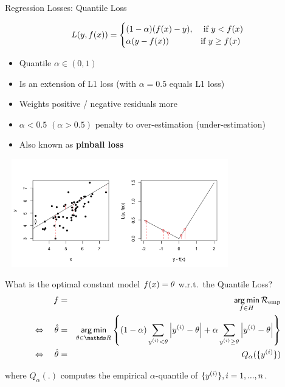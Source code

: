 \begin{vbframe}{Regression Losses: Quantile Loss}
\vspace{-0.3cm}

\footnotesize
$$
L(y, f(x)) = \begin{cases} (1 - \alpha) (f(x) - y), & \text{ if } y < f(x)\\
\alpha (y - f(x)) & \text{if } y \ge f(x)
\end{cases}
$$


\normalsize
\begin{itemize}
\item Quantile $\alpha \in (0,1)$
\item Is an extension of L1 loss (with $\alpha = 0.5$ equals L1 loss)
\item Weights positive / negative residuals more 
\item $\alpha<0.5$ $(\alpha>0.5)$ penalty to over-estimation (under-estimation)
\item Also known as \textbf{pinball loss}
\end{itemize}

\vspace*{-0.5cm}

\begin{center}
\includegraphics[width = 10cm, height = 4.7cm]{figure_man/2_3_loss_pinball_plot2.png}
\end{center}

\framebreak

What is the optimal constant model $f(x) = \theta$ w.r.t.\ the Quantile Loss?
\vspace{-0.2cm}
\begin{eqnarray*}
f &=& \argmin_{f \in \Hspace} \riske \\
\Leftrightarrow\quad 
\hat \theta &=& \argmin_{\theta \in \R}\left\{ (1 - \alpha) \sum_{\yi<\theta}  \left|\yi-\theta\right| + \alpha \sum_{\yi \geq\theta}  \left|\yi-\theta\right|\right\} \\
\Leftrightarrow\quad \hat \theta &=& Q_\alpha(\{\yi\})
\end{eqnarray*}

where $Q_\alpha(.)$ computes the empirical $\alpha$-quantile of $\{y^{(i)}\}, i = 1, ..., n$.


\end{vbframe}


\endlecture

